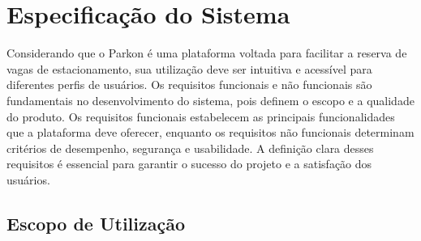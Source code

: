 
\chapter{Especificação do Sistema}
\label{cap:proposta}

Considerando que o Parkon é uma plataforma voltada para facilitar a reserva de vagas de estacionamento, sua utilização deve ser intuitiva e acessível para diferentes perfis de usuários. Os requisitos funcionais e não funcionais são fundamentais no desenvolvimento do sistema, pois definem o escopo e a qualidade do produto. Os requisitos funcionais estabelecem as principais funcionalidades que a plataforma deve oferecer, enquanto os requisitos não funcionais determinam critérios de desempenho, segurança e usabilidade. A definição clara desses requisitos é essencial para garantir o sucesso do projeto e a satisfação dos usuários.


\section{Escopo de Utilização}
\label{sec:escopo}

